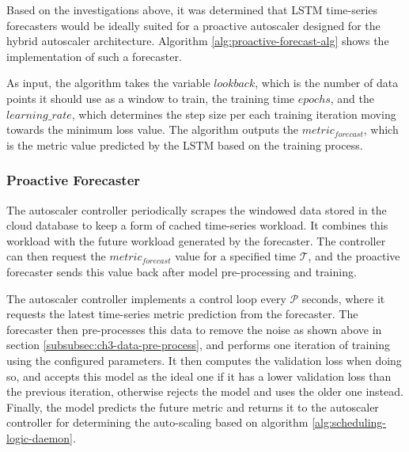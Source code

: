 Based on the investigations above, it was determined that LSTM time-series forecasters would be ideally suited for a proactive autoscaler designed for the hybrid autoscaler architecture. Algorithm \ref{alg:proactive-forecast-alg} shows the implementation of such a forecaster.\par

As input, the algorithm takes the variable $lookback$, which is the number of data points it should use as a window to train, the training time $epochs$, and the $learning\_rate$, which determines the step size per each training iteration moving towards the minimum loss value. The algorithm outputs the $metric_{forecast}$, which is the metric value predicted by the LSTM based on the training process.\par

\subsubsection{Proactive Forecaster}

The autoscaler controller periodically scrapes the windowed data stored in the cloud database to keep a form of cached time-series workload. It combines this workload with the future workload generated by the forecaster. The controller can then request the $metric_{forecast}$ value for a specified time $\mathcal{T}$, and the proactive forecaster sends this value back after model pre-processing and training.\par

The autoscaler controller implements a control loop every $\mathcal{P}$ seconds, where it requests the latest time-series metric prediction from the forecaster. The forecaster then pre-processes this data to remove the noise as shown above in section \ref{subsubsec:ch3-data-pre-process}, and performs one iteration of training using the configured parameters. It then computes the validation loss when doing so, and accepts this model as the ideal one if it has a lower validation loss than the previous iteration, otherwise rejects the model and uses the older one instead. Finally, the model predicts the future metric and returns it to the autoscaler controller for determining the auto-scaling based on algorithm \ref{alg:scheduling-logic-daemon}.\par

